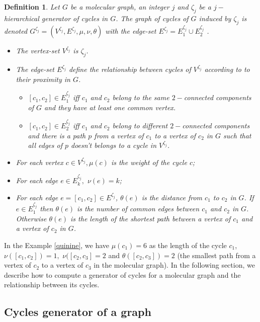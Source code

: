 \documentclass[journal=jacsat,manuscript=article]{achemso}
\newtheorem{definition}{Definition}
\begin{document}
\begin{definition}
Let $G$ be  a molecular graph, an integer $j$ and $\zeta_j$  be a $j-$hierarchical generator of cycles in $G$. The graph of cycles of $G$ induced by $\zeta_j$ is denoted $G^{\zeta_j} = (V^{\zeta_j},E^{\zeta_j},\mu,\nu,\theta)$ with the edge-set $E^{\zeta_j} = E^{\zeta_j}_{1} \cup E^{\zeta_j}_{2}$ .

 \begin{itemize}
 
 \item The vertex-set $V^{\zeta_j}$ is $\zeta_j$.
 \item The edge-set $E^{\zeta_j}$ define the relationship between cycles of  $V^{\zeta_j}$ according to to their proxi\-mity in $G$.
 \begin{itemize}
 \item $[c_1,c_2] \in E^{\zeta_j}_{1}$ iff $c_1$ and $c_2$ belong to the same $2-$connected components of $G$ and they have at least one common vertex.
 \item $[c_1,c_2] \in E^{\zeta_j}_{2}$ iff  $c_1$ and $c_2$ belong to different  $2-$connected components and there is a path $p$ from a vertex of $c_1$ to a vertex of $c_2$ in $G$ such that all edges of $p$ doesn't belongs to a cycle in $V^{\zeta_j}$.
 \end{itemize}
 \item For each vertex $c \in V^{\zeta_j}, \mu(c)$ is the weight of the cycle $c$;
 \item For each edge $e \in E^{\zeta_j}_k,$ $\nu(e) = k$;
 \item For each edge $e= [c_1,c_2]  \in E^{\zeta_j}$, $\theta(e)$ is the distance from $c_1$ to $c_2$ in $G$.  If $e \in E^{\zeta_j}_{1}$ then $\theta(e)$ is the number of common edges between $c_1$ and $c_2$ in $G$. Otherwise $\theta(e)$ is the length of the shortest path between a vertex of $c_1$ and a vertex of $c_2$ in $G$.
 \end{itemize}
\end{definition}

In the Example \ref{quinine}, we have $\mu(c_1) = 6$ as the length of the cycle $c_1$, $\nu([c_1,c_2]) = 1 ,$ $ \nu([c_2,c_3] = 2$ and $\theta([c_2,c_3]) = 2$ (the smallest path from a vertex of $c_2$ to a vertex of $c_3$ in the molecular graph).
In the following section, we describe how to compute a generator of cycles for a molecular graph and the relationship between its cycles.

\subsection{Cycles generator of a graph}
\label{edgecover}
\end{document}
